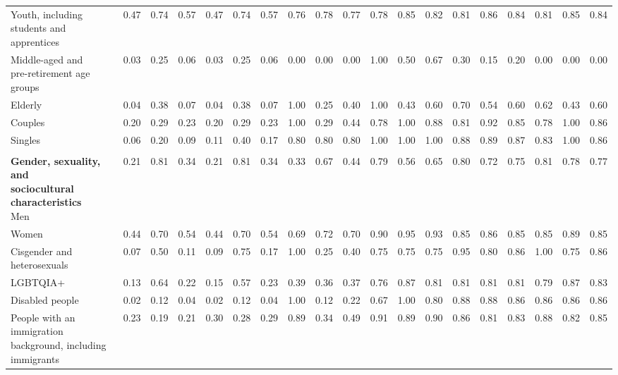 \begin{table}[htb]
\begin{threeparttable}
\begin{tabular}{l ccc ccc ccc ccc ccc ccc}
\shortstack[l]{Youth, including\\[-3pt]students and apprentices} & 0.47 & 0.74 & 0.57 & 0.47 & 0.74 & 0.57 & 0.76 & 0.78 & 0.77 & 0.78 & 0.85 & 0.82 & 0.81 & 0.86 & 0.84 & 0.81 & 0.85 & 0.84 \\
\shortstack[l]{Middle-aged and\\[-3pt]pre-retirement age groups} & 0.03 & 0.25 & 0.06 & 0.03 & 0.25 & 0.06 & 0.00 & 0.00 & 0.00 & 1.00 & 0.50 & 0.67 & 0.30 & 0.15 & 0.20 & 0.00 & 0.00 & 0.00 \\
Elderly & 0.04 & 0.38 & 0.07 & 0.04 & 0.38 & 0.07 & 1.00 & 0.25 & 0.40 & 1.00 & 0.43 & 0.60 & 0.70 & 0.54 & 0.60 & 0.62 & 0.43 & 0.60 \\
Couples & 0.20 & 0.29 & 0.23 & 0.20 & 0.29 & 0.23 & 1.00 & 0.29 & 0.44 & 0.78 & 1.00 & 0.88 & 0.81 & 0.92 & 0.85 & 0.78 & 1.00 & 0.86 \\
Singles & 0.06 & 0.20 & 0.09 & 0.11 & 0.40 & 0.17 & 0.80 & 0.80 & 0.80 & 1.00 & 1.00 & 1.00 & 0.88 & 0.89 & 0.87 & 0.83 & 1.00 & 0.86 \\
\rule{0pt}{5pt} &  &  &  &  &  &  &  &  &  &  &  &  &  &  &  &  &  &  \\
\shortstack[l]{\textbf{Gender, sexuality, and}\\[-3pt]\textbf{sociocultural characteristics}\\[3pt]Men} & 0.21 & 0.81 & 0.34 & 0.21 & 0.81 & 0.34 & 0.33 & 0.67 & 0.44 & 0.79 & 0.56 & 0.65 & 0.80 & 0.72 & 0.75 & 0.81 & 0.78 & 0.77 \\
Women & 0.44 & 0.70 & 0.54 & 0.44 & 0.70 & 0.54 & 0.69 & 0.72 & 0.70 & 0.90 & 0.95 & 0.93 & 0.85 & 0.86 & 0.85 & 0.85 & 0.89 & 0.85 \\
\shortstack[l]{Cisgender and\\[-3pt]heterosexuals} & 0.07 & 0.50 & 0.11 & 0.09 & 0.75 & 0.17 & 1.00 & 0.25 & 0.40 & 0.75 & 0.75 & 0.75 & 0.95 & 0.80 & 0.86 & 1.00 & 0.75 & 0.86 \\
LGBTQIA+ & 0.13 & 0.64 & 0.22 & 0.15 & 0.57 & 0.23 & 0.39 & 0.36 & 0.37 & 0.76 & 0.87 & 0.81 & 0.81 & 0.81 & 0.81 & 0.79 & 0.87 & 0.83 \\
Disabled people & 0.02 & 0.12 & 0.04 & 0.02 & 0.12 & 0.04 & 1.00 & 0.12 & 0.22 & 0.67 & 1.00 & 0.80 & 0.88 & 0.88 & 0.86 & 0.86 & 0.86 & 0.86 \\
\shortstack[l]{People with an immigration\\[-3pt]background, including immigrants} & 0.23 & 0.19 & 0.21 & 0.30 & 0.28 & 0.29 & 0.89 & 0.34 & 0.49 & 0.91 & 0.89 & 0.90 & 0.86 & 0.81 & 0.83 & 0.88 & 0.82 & 0.85 \\

\end{tabular}
\end{threeparttable}
\end{table}
